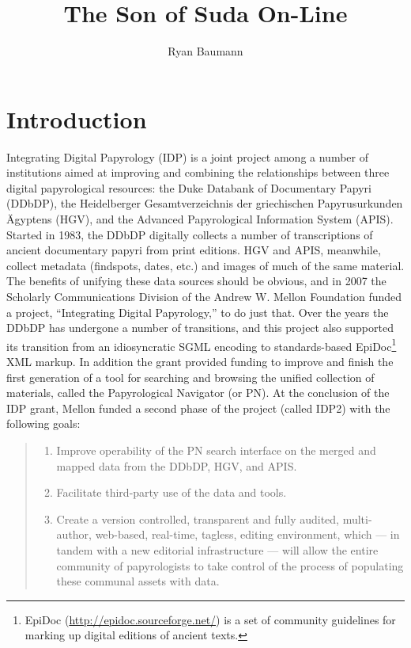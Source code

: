 \documentclass[]{article}
\title{The Son of Suda On-Line}
\author{Ryan Baumann}
\date{}
\begin{document}
\ifpdf
{}
\else
{}
\fi

\maketitle

\section*{Introduction}

Integrating Digital Papyrology (IDP) is a joint project among a number of institutions aimed at improving and combining the relationships between three digital papyrological resources: the Duke Databank of Documentary Papyri (DDbDP), the Heidelberger Gesamtverzeichnis der griechischen Papyrusurkunden \"{A}gyptens (HGV), and the Advanced Papyrological Information System (APIS). Started in 1983, the DDbDP digitally collects a number of transcriptions of ancient documentary papyri from print editions. HGV and APIS, meanwhile, collect metadata (findspots, dates, etc.) and images of much of the same material. The benefits of unifying these data sources should be obvious, and in 2007 the Scholarly Communications Division of the Andrew W. Mellon Foundation funded a project, “Integrating Digital Papyrology,” to do just that. Over the years the DDbDP has undergone a number of transitions, and this project also supported its transition from an idiosyncratic SGML encoding to standards-based EpiDoc\footnote{EpiDoc (\url{http://epidoc.sourceforge.net/}) is a set of community guidelines for marking up digital editions of ancient texts.} XML markup. In addition the grant provided funding to improve and finish the first generation of a tool for searching and browsing the unified collection of materials, called the Papyrological Navigator (or PN). At the conclusion of the IDP grant, Mellon funded a second phase of the project (called IDP2) with the following goals:
\begin{quote}
  \begin{enumerate}
    \item Improve operability of the PN search interface on the merged and mapped data from the DDbDP, HGV, and APIS.
    \item Facilitate third-party use of the data and tools.
    \item Create a version controlled, transparent and fully audited, multi-author, web-based, real-time, tagless, editing environment, which — in tandem with a new editorial infrastructure — will allow the entire community of papyrologists to take control of the process of populating these communal assets with data.
  \end{enumerate}
\end{quote}
\end{document}
